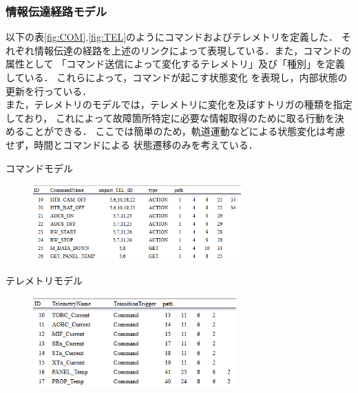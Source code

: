 \documentclass[11pt]{jsarticle}%
\begin{document}
\begin{multicols}{2}
\vspace{-2zh}
\subsubsection{情報伝達経路モデル}
以下の表\ref{fig:COM},\ref{fig:TEL}のようにコマンドおよびテレメトリを定義した．
それぞれ情報伝達の経路を上述のリンクによって表現している．また，コマンドの属性として
「コマンド送信によって変化するテレメトリ」及び「種別」を定義している．
これらによって，コマンドが起こす状態変化
を表現し，内部状態の更新を行っている．\\%
また，テレメトリのモデルでは，テレメトリに変化を及ぼすトリガの種類を指定しており，
これによって故障箇所特定に必要な情報取得のために取る行動を決めることができる．
ここでは簡単のため，軌道運動などによる状態変化は考慮せず，時間とコマンドによる
状態遷移のみを考えている．

\begin{table}[H]
  \centering
  \caption{コマンドモデル}
  \label{fig:COM}
\end{table}
\vspace{-3zh}
\begin{figure}[H]
  \centering
    \includegraphics[width=8cm]{../figure/COM_resume.png}
\end{figure}

\begin{table}[H]
  \centering
  \caption{テレメトリモデル}
  \label{fig:TEL}
\end{table}
\vspace{-3zh}
\begin{figure}[H]
  \centering
    \includegraphics[height=3.5cm]{../figure/TEL_resume.png}
\end{figure}


\end{multicols}
\end{document}
